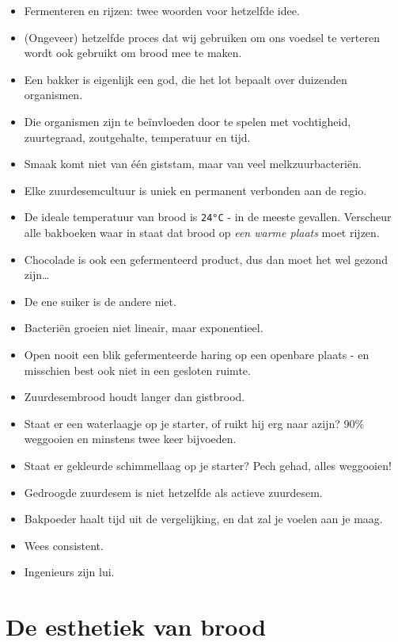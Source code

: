 \documentclass[
  11pt,
  dutch,
]{memoir}
\providecommand{\tightlist}{%
  \setlength{\itemsep}{0pt}\setlength{\parskip}{0pt}}
\begin{document}
\begin{itemize}
\tightlist
\item
  Fermenteren en rijzen: twee woorden voor hetzelfde idee.
\item
  (Ongeveer) hetzelfde proces dat wij gebruiken om ons voedsel te
  verteren wordt ook gebruikt om brood mee te maken.
\item
  Een bakker is eigenlijk een god, die het lot bepaalt over duizenden
  organismen.
\item
  Die organismen zijn te beïnvloeden door te spelen met vochtigheid,
  zuurtegraad, zoutgehalte, temperatuur en tijd.
\item
  Smaak komt niet van één giststam, maar van veel melkzuurbacteriën.
\item
  Elke zuurdesemcultuur is uniek en permanent verbonden aan de regio.
\item
  De ideale temperatuur van brood is \texttt{24°C} - in de meeste
  gevallen. Verscheur alle bakboeken waar in staat dat brood op
  \emph{een warme plaats} moet rijzen.
\item
  Chocolade is ook een gefermenteerd product, dus dan moet het wel
  gezond zijn\ldots{}
\item
  De ene suiker is de andere niet.
\item
  Bacteriën groeien niet lineair, maar exponentieel.
\item
  Open nooit een blik gefermenteerde haring op een openbare plaats - en
  misschien best ook niet in een gesloten ruimte.
\item
  Zuurdesembrood houdt langer dan gistbrood.
\item
  Staat er een waterlaagje op je starter, of ruikt hij erg naar azijn?
  90\% weggooien en minstens twee keer bijvoeden.
\item
  Staat er gekleurde schimmellaag op je starter? Pech gehad, alles
  weggooien!
\item
  Gedroogde zuurdesem is niet hetzelfde als actieve zuurdesem.
\item
  Bakpoeder haalt tijd uit de vergelijking, en dat zal je voelen aan je
  maag.
\item
  Wees consistent.
\item
  Ingenieurs zijn lui.
\end{itemize}

\hypertarget{de-esthetiek-van-brood}{%
\chapter{De esthetiek van brood}\label{de-esthetiek-van-brood}}
\end{document}
